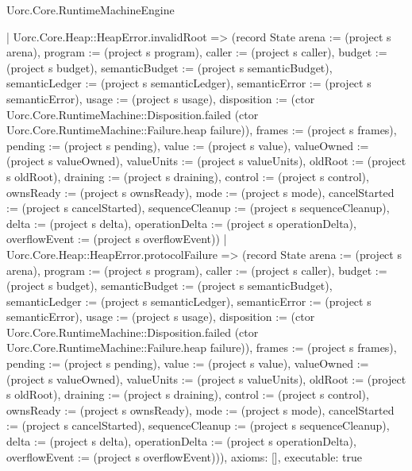 \begin{lexlean}{Uorc.Core.RuntimeMachineEngine}
\begin{semanticmodule}
{    | Uorc.Core.Heap::HeapError.invalidRoot => (record State {arena := (project s arena), program := (project s program), caller := (project s caller), budget := (project s budget), semanticBudget := (project s semanticBudget), semanticLedger := (project s semanticLedger), semanticError := (project s semanticError), usage := (project s usage), disposition := (ctor Uorc.Core.RuntimeMachine::Disposition.failed (ctor Uorc.Core.RuntimeMachine::Failure.heap failure)), frames := (project s frames), pending := (project s pending), value := (project s value), valueOwned := (project s valueOwned), valueUnits := (project s valueUnits), oldRoot := (project s oldRoot), draining := (project s draining), control := (project s control), ownsReady := (project s ownsReady), mode := (project s mode), cancelStarted := (project s cancelStarted), sequenceCleanup := (project s sequenceCleanup), delta := (project s delta), operationDelta := (project s operationDelta), overflowEvent := (project s overflowEvent)})
    | Uorc.Core.Heap::HeapError.protocolFailure => (record State {arena := (project s arena), program := (project s program), caller := (project s caller), budget := (project s budget), semanticBudget := (project s semanticBudget), semanticLedger := (project s semanticLedger), semanticError := (project s semanticError), usage := (project s usage), disposition := (ctor Uorc.Core.RuntimeMachine::Disposition.failed (ctor Uorc.Core.RuntimeMachine::Failure.heap failure)), frames := (project s frames), pending := (project s pending), value := (project s value), valueOwned := (project s valueOwned), valueUnits := (project s valueUnits), oldRoot := (project s oldRoot), draining := (project s draining), control := (project s control), ownsReady := (project s ownsReady), mode := (project s mode), cancelStarted := (project s cancelStarted), sequenceCleanup := (project s sequenceCleanup), delta := (project s delta), operationDelta := (project s operationDelta), overflowEvent := (project s overflowEvent)})),
  axioms: [],
  executable: true
}


\end{semanticmodule}
\end{lexlean}
